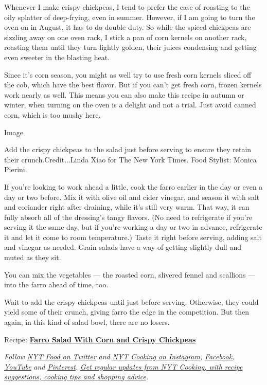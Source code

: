 Whenever I make crispy chickpeas, I tend to prefer the ease of roasting
to the oily splatter of deep-frying, even in summer. However, if I am
going to turn the oven on in August, it has to do double duty. So while
the spiced chickpeas are sizzling away on one oven rack, I stick a pan
of corn kernels on another rack, roasting them until they turn lightly
golden, their juices condensing and getting even sweeter in the blasting
heat.

Since it's corn season, you might as well try to use fresh corn kernels
sliced off the cob, which have the best flavor. But if you can't get
fresh corn, frozen kernels work nearly as well. This means you can also
make this recipe in autumn or winter, when turning on the oven is a
delight and not a trial. Just avoid canned corn, which is too mushy
here.

Image

Add the crispy chickpeas to the salad just before serving to ensure they
retain their crunch.Credit...Linda Xiao for The New York Times. Food
Stylist: Monica Pierini.

If you're looking to work ahead a little, cook the farro earlier in the
day or even a day or two before. Mix it with olive oil and cider
vinegar, and season it with salt and coriander right after draining,
while it's still very warm. That way, it can fully absorb all of the
dressing's tangy flavors. (No need to refrigerate if you're serving it
the same day, but if you're working a day or two in advance, refrigerate
it and let it come to room temperature.) Taste it right before serving,
adding salt and vinegar as needed. Grain salads have a way of getting
slightly dull and muted as they sit.

You can mix the vegetables --- the roasted corn, slivered fennel and
scallions --- into the farro ahead of time, too.

Wait to add the crispy chickpeas until just before serving. Otherwise,
they could yield some of their crunch, giving farro the edge in the
competition. But then again, in this kind of salad bowl, there are no
losers.

Recipe:
\textbf{\href{https://cooking.nytimes.com/recipes/1021304-farro-salad-with-corn-and-crispy-chickpeas}{Farro
Salad With Corn and Crispy Chickpeas}}

\emph{Follow} \href{https://twitter.com/nytfood}{\emph{NYT Food on
Twitter}} \emph{and}
\href{https://www.instagram.com/nytcooking/}{\emph{NYT Cooking on
Instagram}}\emph{,}
\href{https://www.facebook.com/nytcooking/}{\emph{Facebook}}\emph{,}
\href{https://www.youtube.com/nytcooking}{\emph{YouTube}} \emph{and}
\href{https://www.pinterest.com/nytcooking/}{\emph{Pinterest}}\emph{.}
\href{https://www.nytimes.com/newsletters/cooking}{\emph{Get regular
updates from NYT Cooking, with recipe suggestions, cooking tips and
shopping advice}}\emph{.}

